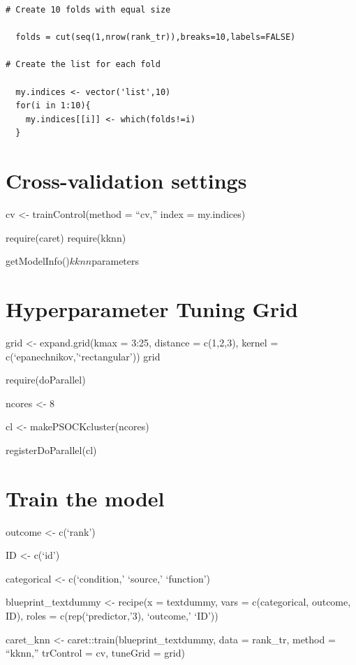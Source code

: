 \documentclass[
  english,
  man]{apa6}
\begin{document}
\begin{verbatim}
# Create 10 folds with equal size

  folds = cut(seq(1,nrow(rank_tr)),breaks=10,labels=FALSE)

# Create the list for each fold 
  
  my.indices <- vector('list',10)
  for(i in 1:10){
    my.indices[[i]] <- which(folds!=i)
  }
\end{verbatim}

\hypertarget{cross-validation-settings}{%
\section{Cross-validation settings}\label{cross-validation-settings}}

cv \textless- trainControl(method = ``cv,''
index = my.indices)

require(caret)
require(kknn)

getModelInfo()\(kknn\)parameters

\hypertarget{hyperparameter-tuning-grid}{%
\section{Hyperparameter Tuning Grid}\label{hyperparameter-tuning-grid}}

grid \textless- expand.grid(kmax = 3:25,
distance = c(1,2,3),
kernel = c(`epanechnikov,'`rectangular'))
grid

require(doParallel)

ncores \textless- 8

cl \textless- makePSOCKcluster(ncores)

registerDoParallel(cl)

\hypertarget{train-the-model}{%
\section{Train the model}\label{train-the-model}}

outcome \textless- c(`rank')

ID \textless- c(`id')

categorical \textless- c(`condition,' `source,' `function')

blueprint\_textdummy \textless- recipe(x = textdummy,
vars = c(categorical, outcome, ID),
roles = c(rep(`predictor,'3), `outcome,' `ID'))

caret\_knn \textless- caret::train(blueprint\_textdummy,
data = rank\_tr,
method = ``kknn,''
trControl = cv,
tuneGrid = grid)
\end{document}
